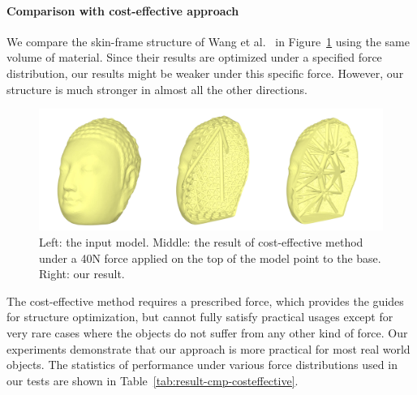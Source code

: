 \paragraph{Comparison with cost-effective approach}
We compare the skin-frame structure of Wang et al.~ in Figure~\ref{fig:result-cmp-costeffective} using the same volume of material. Since their results are optimized under a specified force distribution, our results might be weaker under this specific force. However, our structure is much stronger in almost all the other directions.

\begin{figure}[htb]
  \centering
  \includegraphics[width=1.0\linewidth]{Figures/head/head}
  \caption{\label{fig:result-cmp-costeffective}
  Left: the input model. Middle: the result of cost-effective method under a 40N force applied on the top of the model point to the base. Right: our result.}
\end{figure}

The cost-effective method requires a prescribed force, which provides the guides for structure optimization, but cannot fully satisfy practical usages except for very rare cases where the objects do not suffer from any other kind of force. Our experiments demonstrate that our approach is more practical for most real world objects. The statistics of performance under various force distributions used in our tests are shown in Table~\ref{tab:result-cmp-costeffective}.


